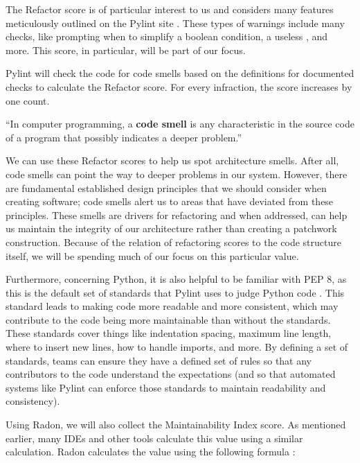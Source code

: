 The Refactor score is of particular interest to us and considers many features meticulously outlined on the Pylint site \cite{pylint:refactor}. These types of warnings include many checks, like prompting when to simplify a boolean condition, a useless , and more. This score, in particular, will be part of our focus.

Pylint will check the code for code smells based on the definitions for documented checks to calculate the Refactor score. For every infraction, the score increases by one count. 


\vspace{0.25cm}
\begin{displayquote}
  ``In computer programming, a \textbf{code smell} is any characteristic in the source code of a program that possibly indicates a deeper problem.'' \cite{wiki:code-smells}
\end{displayquote}
\vspace{0.25cm}

We can use these Refactor scores to help us spot architecture smells. After all, code smells can point the way to deeper problems in our system. However, there are fundamental established design principles that we should consider when creating software; code smells alert us to areas that have deviated from these principles. These smells are drivers for refactoring and when addressed, can help us maintain the integrity of our architecture rather than creating a patchwork construction. Because of the relation of refactoring scores to the code structure itself, we will be spending much of our focus on this particular value.

Furthermore, concerning Python, it is also helpful to be familiar with PEP 8, as this is the default set of standards that Pylint uses to judge Python code \cite{pylint:pep8}. This standard leads to making code more readable and more consistent, which may contribute to the code being more maintainable than without the standards. These standards cover things like indentation spacing, maximum line length, where to insert new lines, how to handle imports, and more. By defining a set of standards, teams can ensure they have a defined set of rules so that any contributors to the code understand the expectations (and so that automated systems like Pylint can enforce those standards to maintain readability and consistency).

Using Radon, we will also collect the Maintainability Index score. As mentioned earlier, many IDEs and other tools calculate this value using a similar calculation. Radon calculates the value using the following formula \cite{radon:docs}:


